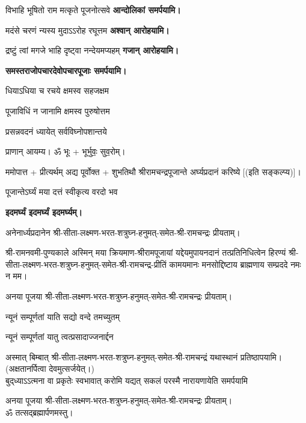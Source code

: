 \begin{center}
{विभाहि भूषितो राम मत्कृते पूजनोत्सवे}
\textbf{\hfill आन्दोलिकां समर्पयामि।}

{मदंसे चरणं न्यस्य मुदाऽऽरोह रघूत्तम}
\textbf{\hfill अश्वान् आरोहयामि।}

{द्रष्टुं त्वां मगजे भाहि दृष्ट्वा नन्देयमप्यहम्}
\textbf{\hfill गजान् आरोहयामि।}

\textbf{समस्तराजोपचारदेवोपचारपूजाः समर्पयामि।}

{धियाऽधिया च रचये क्षमस्व सहजक्षम}

{पूजाविधिं न जानामि क्षमस्व पुरुषोत्तम}


{प्रसन्नवदनं ध्यायेत् सर्वविघ्नोपशान्तये}

प्राणान् आयम्य। ॐ भूः + भूर्भुवः॒ सुव॒रोम्।

ममोपात्त + प्रीत्यर्थम् अद्य पूर्वोक्त + शुभतिथौ श्रीरामचन्द्रपूजान्ते अर्घ्यप्रदानं करिष्ये [(इति सङ्कल्प्य)]।

{पूजान्तेऽर्घ्यं मया दत्तं स्वीकृत्य वरदो भव}

\textbf{\devAya{} इदमर्घ्यं इदमर्घ्यं इदमर्घ्यम्।}

अनेनार्ध्यप्रदानेन श्री-सीता-लक्ष्मण-भरत-शत्रुघ्न-हनुमत्-समेत-श्री-रामचन्द्रः प्रीयताम्।

\hiranyagarbha

श्री-रामनवमी-पुण्यकाले अस्मिन् मया क्रियमाण-श्रीरामपूजायां यद्देयमुपायनदानं तत्प्रतिनिधित्वेन हिरण्यं श्री-सीता-लक्ष्मण-भरत-शत्रुघ्न-हनुमत्-समेत-श्री-रामचन्द्र-प्रीतिं
कामयमानः मनसोद्दिष्टाय ब्राह्मणाय सम्प्रददे नमः न मम।

अनया पूजया श्री-सीता-लक्ष्मण-भरत-शत्रुघ्न-हनुमत्-समेत-श्री-रामचन्द्रः प्रीयताम्।

{न्यूनं सम्पूर्णतां याति सद्यो वन्दे तमच्युतम्}

{न्यूनं सम्पूर्णतां यातु त्वत्प्रसादाज्जनार्द्दन}

अस्मात् बिम्बात् श्री-सीता-लक्ष्मण-भरत-शत्रुघ्न-हनुमत्-समेत-श्री-रामचन्द्रं यथास्थानं प्रतिष्ठापयामि।\\
(अक्षतानर्पित्वा देवमुत्सर्जयेत्।)\\

{बुद्‌ध्याऽऽत्मना वा प्रकृतेः स्वभावात्}
{करोमि यद्यत् सकलं परस्मै}
{नारायणायेति समर्पयामि}

अनया पूजया श्री-सीता-लक्ष्मण-भरत-शत्रुघ्न-हनुमत्-समेत-श्री-रामचन्द्रः प्रीयताम्।\\
ॐ तत्सद्ब्रह्मार्पणमस्तु।

\end{center}

\closesub


\closesection